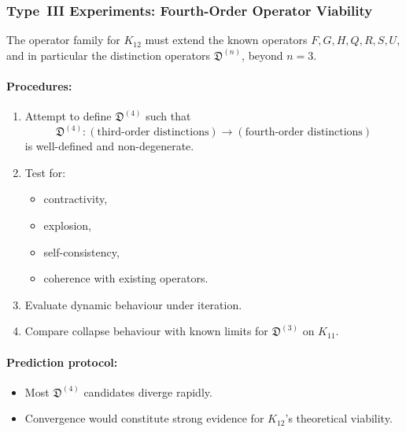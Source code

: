 \subsubsection{Type~III Experiments: Fourth-Order Operator Viability}

The operator family for $K_{12}$ must extend the known operators
$F, G, H, Q, R, S, U$, and in particular the distinction operators
$\mathfrak{D}^{(n)}$, beyond $n=3$.

\paragraph{Procedures:}

\begin{enumerate}
    \item Attempt to define $\mathfrak{D}^{(4)}$ such that
          \[
              \mathfrak{D}^{(4)} :
               (\text{third-order distinctions})
               \longrightarrow
               (\text{fourth-order distinctions})
          \]
          is well-defined and non-degenerate.
    \item Test for:
          \begin{itemize}
              \item contractivity,
              \item explosion,
              \item self-consistency,
              \item coherence with existing operators.
          \end{itemize}
    \item Evaluate dynamic behaviour under iteration.
    \item Compare collapse behaviour with known limits for
          $\mathfrak{D}^{(3)}$ on $K_{11}$.
\end{enumerate}

\paragraph{Prediction protocol:}

\begin{itemize}
    \item Most $\mathfrak{D}^{(4)}$ candidates diverge rapidly.
    \item Convergence would constitute strong evidence for $K_{12}$'s
          theoretical viability.
\end{itemize}



